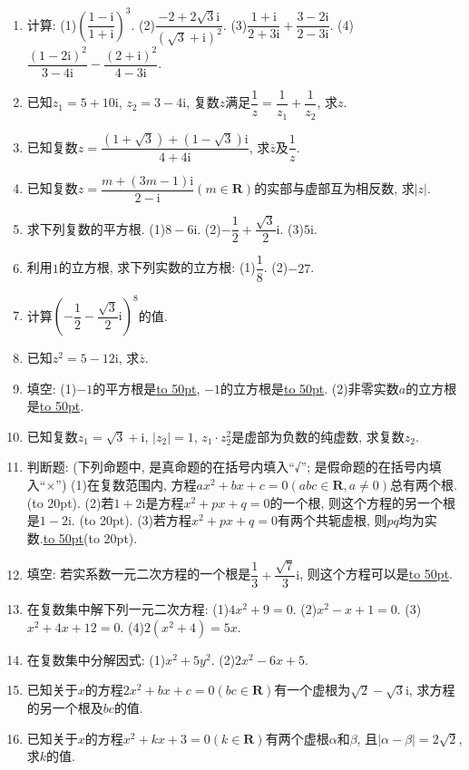 \documentclass[10pt,a4paper]{article}
\newcommand{\blank}[1]{\underline{\hbox to #1pt{}}}
\newcommand{\bracket}[1]{(\hbox to #1pt{})}
\begin{document}
\begin{enumerate}[1.]
\item 计算:
(1)$(\dfrac{1-\mathrm{i}}{1+\mathrm{i}})^3$.							(2)$\dfrac{-2+2\sqrt 3\mathrm{i}}{{{(\sqrt 3+\mathrm{i})}^2}}$.
(3)$\dfrac{1+\mathrm{i}}{2+3\mathrm{i}}+\dfrac{3-2\mathrm{i}}{2-3\mathrm{i}}$.						(4)$\dfrac{{{(1-2\mathrm{i})}^2}}{3-4\mathrm{i}}-\dfrac{{{(2+\mathrm{i})}^2}}{4-3\mathrm{i}}$.
\item 已知$z_1=5+10\mathrm{i}$, $z_2=3-4\mathrm{i}$, 复数$z$满足$\dfrac 1z=\dfrac 1{z_1}+\dfrac 1{z_2}$, 求$z$.
\item 已知复数$z=\dfrac{(1+\sqrt 3)+(1-\sqrt 3)\mathrm{i}}{4+4\mathrm{i}}$, 求$\overline z$及$\dfrac 1z$.
\item 已知复数$z=\dfrac{m+(3m-1){\mathrm{i}}}{2-{\mathrm{i}}}(m\in \mathbf{R})$的实部与虚部互为相反数, 求$|z|$.
\item 求下列复数的平方根.
(1)$8-6\mathrm{i}$.								(2)$-\dfrac 12+\dfrac{\sqrt 3}2\mathrm{i}$.
(3)$5\mathrm{i}$.	
\item 利用$1$的立方根, 求下列实数的立方根:
(1)$\dfrac 18$.									(2)$-27$.
\item 计算$(-\dfrac 12-\dfrac{\sqrt 3}2\mathrm{i})^8$的值.
\item 已知$z^2=5-12\mathrm{i}$, 求$\overline z$.
\item 填空:
(1)$-1$的平方根是\blank{50}, $-1$的立方根是\blank{50}.
(2)非零实数$a$的立方根是\blank{50}.
\item 已知复数$z_1=\sqrt 3+\mathrm{i}$, $|z_2|=1$, $z_1\cdot z_2^2$是虚部为负数的纯虚数, 求复数$z_2$.
\item 判断题: (下列命题中, 是真命题的在括号内填入``√''; 是假命题的在括号内填入``×'')
(1)在复数范围内, 方程$ax^2+bx+c=0(abc\in \mathbf{R},a\ne 0)$总有两个根.  \bracket{20}.
(2)若$1+2\mathrm{i}$是方程$x^2+px+q=0$的一个根, 则这个方程的另一个根是$1-2\mathrm{i}$.  \bracket{20}.
(3)若方程$x^2+px+q=0$有两个共轭虚根, 则$pq$均为实数.\blank{50}\bracket{20}.
\item 填空:
若实系数一元二次方程的一个根是$\dfrac 13+\dfrac{\sqrt 7}3\mathrm{i}$, 则这个方程可以是\blank{50}.
\item 在复数集中解下列一元二次方程:
(1)$4x^2+9=0$.							(2)$x^2-x+1=0$.
(3)$x^2+4x+12=0$.					(4)$2(x^2+4)=5x$.
\item 在复数集中分解因式:
(1)$x^2+5y^2$.							(2)$2x^2-6x+5$.
\item 已知关于$x$的方程$2x^2+bx+c=0(bc\in \mathbf{R})$有一个虚根为$\sqrt 2-\sqrt 3\mathrm{i}$, 求方程的另一个根及$bc$的值.
\item 已知关于$x$的方程$x^2+kx+3=0(k\in \mathbf{R})$有两个虚根$\alpha$和$\beta$, 且$|\alpha -\beta|=2\sqrt 2$, 求$k$的值.

\end{enumerate}
\end{document}
